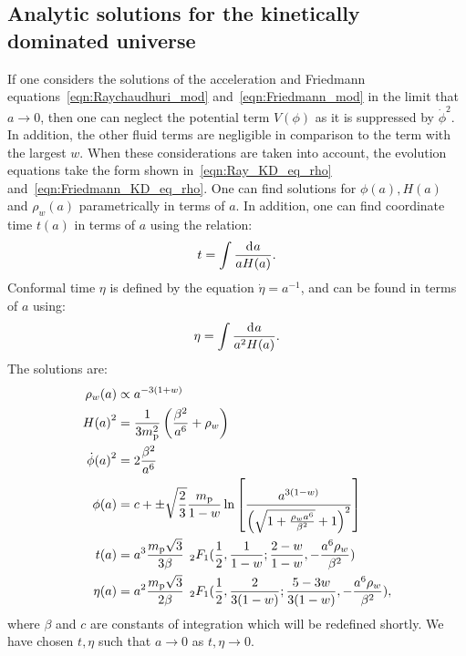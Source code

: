 \subsection{Analytic solutions for the kinetically dominated universe} 
If one considers the solutions of the acceleration and Friedmann equations~\eqref{eqn:Raychaudhuri_mod} and~\eqref{eqn:Friedmann_mod} in the limit that \(a\to0\), then one can neglect the potential term \(V(\phi)\) as it is suppressed by \(\dot{\phi}^2\). In addition, the other fluid terms are negligible in comparison to the term with the largest \(w\).  When these considerations are taken into account, the evolution equations take the form shown in~\eqref{eqn:Ray_KD_eq_rho} and~\eqref{eqn:Friedmann_KD_eq_rho}. One can find solutions for \(\phi(a),H(a)\) and \(\rho_w(a)\) parametrically in terms of \(a\).  In addition, one can find coordinate time \(t(a)\) in terms of \(a\) using the relation:
%
\begin{equation}
  t = \int \frac{\operatorname{d}^{}\!{a}}{aH(a)}.
\end{equation}
%
Conformal time \(\eta\) is defined by the equation \(\dot{\eta} =
a^{-1}\), and can be found in terms of \(a\) using:
%
\begin{equation}
  \eta = \int \frac{\operatorname{d}^{}\!{a}}{a^2H(a)}.
\end{equation}
%
The solutions are:
%
\begin{align}
  \rho_w(a) 
  &\propto 
  a^{-3(1+w)} 
  \\
  H{(a)}^2 
  &= 
  \frac{1}{3m_{\mathrm{p}}^2}\left(\frac{\beta^2}{a^6} + \rho_w\right)  
  \label{eqn:H_of_a}
  \\
  \dot{\phi}{(a)}^2
  &=
  2\frac{\beta^2}{a^6} 
  \label{eqn:dotphi_of_a}
  \\
  \phi(a)
  &=
  c + \pm
  \sqrt{\frac{2}{3}}\frac{m_{\mathrm{p}}}{1-w} \ln \left[ 
  \frac 
  {{a}^{3(1-w)}}
  {{\left(\sqrt{1+\frac{\rho_w{a}^{6}}{\beta^2}}+1\right)}^2} 
  \right]  
  \label{eqn:phi_of_a}
  \\
  t(a)
  &=
  a^3 \frac{m_{\mathrm{p}}\sqrt{3}}{3\beta} 
  \:\: 
  {_2F_1}(
  \frac{1}{2},
  \frac{1}{1-w};
  \frac{2-w}{1-w},
  -\frac{a^6\rho_w}{\beta^2}
  ) 
  \label{eqn:t_of_a}
  \\
  \eta(a) 
  &= 
  a^2 \frac{m_{\mathrm{p}}\sqrt{3}}{2\beta}
  \:\: 
  {_2F_1}(
  \frac{1}{2},
  \frac{2}{3(1-w)};
  \frac{5-3w}{3(1-w)},
  -\frac{a^6\rho_w}{\beta^2}
  ),
  \label{eqn:eta_of_a}
\end{align}
%
where \(\beta\) and \(c\) are constants of integration which will be redefined shortly. We have chosen \(t,\eta\) such that \(a\to0\) as \(t,\eta \to 0\).


